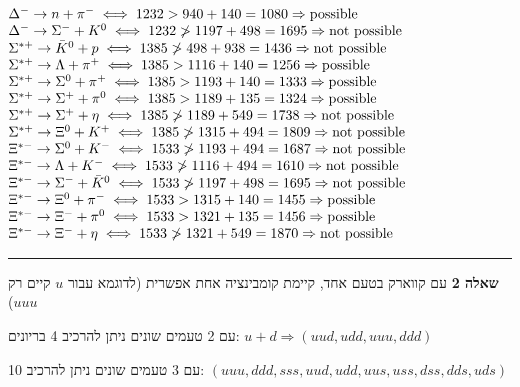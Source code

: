 \documentclass[14pt]{extarticle}
\makeatletter
\newenvironment{lefteqs}{%
    \begin{english}%
    \begin{flushleft}%
    \renewcommand{\arraystretch}{1.3}%
    $\begin{array}{@{}l@{}}%
}{%
    \end{array}$%
    \end{flushleft}%
    \end{english}%
}
\makeatother
\begin{document}
\begin{lefteqs}
    \Delta^- \to n + \pi^- \iff 1232 > 940 + 140 = 1080 \Rightarrow \text{possible} \\
    \Delta^- \to \Sigma^- + K^0 \iff 1232 \ngtr 1197 + 498 = 1695 \Rightarrow \text{not possible} \\

    \Sigma^{*+} \to \bar{K}^0 + p \iff 1385 \ngtr 498 + 938 = 1436 \Rightarrow \text{not possible} \\
    \Sigma^{*+} \to \Lambda + \pi^+ \iff 1385 > 1116 + 140 = 1256 \Rightarrow \text{possible} \\
    \Sigma^{*+} \to \Sigma^0 + \pi^+ \iff 1385 > 1193 + 140 = 1333 \Rightarrow \text{possible} \\
    \Sigma^{*+} \to \Sigma^+ + \pi^0 \iff 1385 > 1189 + 135 = 1324 \Rightarrow \text{possible} \\
    \Sigma^{*+} \to \Sigma^+ + \eta \iff 1385 \ngtr 1189 + 549 = 1738 \Rightarrow \text{not possible} \\
    \Sigma^{*+} \to \Xi^0 + K^+ \iff 1385 \ngtr 1315 + 494 = 1809 \Rightarrow \text{not possible} \\

    \Xi^{*-} \to \Sigma^0 + K^- \iff 1533 \ngtr 1193 + 494 = 1687 \Rightarrow \text{not possible} \\
    \Xi^{*-} \to \Lambda + K^- \iff 1533 \ngtr 1116 + 494 = 1610 \Rightarrow \text{not possible} \\
    \Xi^{*-} \to \Sigma^- + \bar{K}^0 \iff 1533 \ngtr 1197 + 498 = 1695 \Rightarrow \text{not possible} \\
    \Xi^{*-} \to \Xi^0 + \pi^- \iff 1533 > 1315 + 140 = 1455 \Rightarrow \text{possible} \\
    \Xi^{*-} \to \Xi^- + \pi^0 \iff 1533 > 1321 + 135 = 1456 \Rightarrow \text{possible} \\
    \Xi^{*-} \to \Xi^- + \eta \iff 1533 \ngtr 1321 + 549 = 1870 \Rightarrow \text{not possible}
\end{lefteqs}

\vspace{3em}
\hrule
\vspace{2em}

\textbf{\large שאלה 2}
עם קווארק בטעם אחד, קיימת קומבינציה אחת אפשרית (לדוגמא עבור $u$ קיים רק $uuu$)

עם 2 טעמים שונים ניתן להרכיב 4 בריונים: $u + d \Rightarrow (uud, udd, uuu, ddd)$

עם 3 טעמים שונים ניתן להרכיב 10: $(uuu, ddd, sss, uud, udd, uus, uss, dss, dds, uds)$
\end{document}
